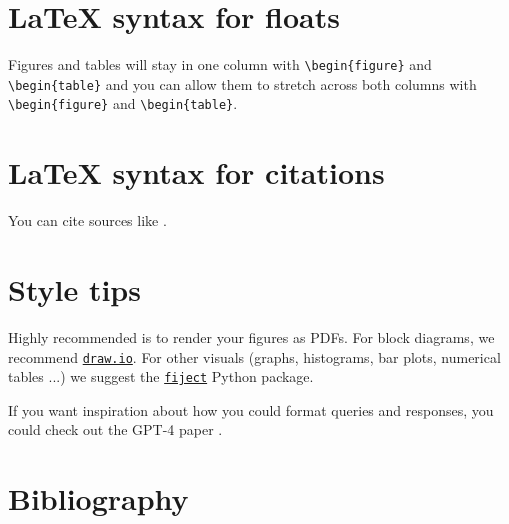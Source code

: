 \documentclass[a4paper,11pt]{article}
\begin{document}
\author{Firstname Lastname (r0??????)}

\twocolumn[\maketitle]


\section{\LaTeX{} syntax for floats}
Figures and tables will stay in one column with \verb|\begin{figure}| and \verb|\begin{table}| and you can allow them to stretch across both columns with \verb|\begin{figure}| and \verb|\begin{table}|.

\section{\LaTeX{} syntax for citations}
You can cite sources like \textcite{ouyang_training_2022}.

\section{Style tips}
Highly recommended is to render your figures as PDFs. For block diagrams, we recommend \href{https://draw.io}{\texttt{draw.io}}. For other visuals (graphs, histograms, bar plots, numerical tables ...) we suggest the \href{https://github.com/bauwenst/fiject}{\texttt{fiject}} Python package.

If you want inspiration about how you could format queries and responses, you could check out the GPT-4 paper \parencite{bubeck_sparks_2023}.


\newpage
\onecolumn
\appendix

\section*{Bibliography}
\printbibliography[heading=none]
\end{document}
